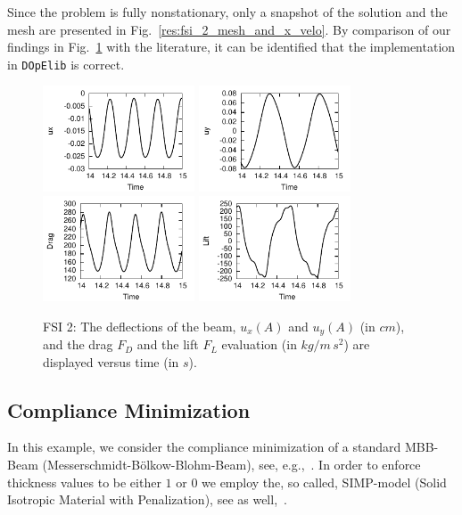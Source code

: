 \documentclass[smallextended]{svjour3}       %
\numberwithin{equation}{section}
\newcommand{\dope}{\texttt{DOpElib}}
\begin{document}
Since the problem is fully nonstationary, only a snapshot of the solution
and the mesh are presented in Fig.~\ref{res:fsi_2_mesh_and_x_velo}. 
By comparison of our findings in Fig.~\ref{res:results_ux_and_uy_fsi_2}
with the literature, it can be identified that 
the implementation in \dope{} is correct.

\begin{figure}[hbt]
\centering
{\includegraphics[width=4.5cm]{Pictures/ux_FSI_2_FS_t_3e-2_t_15e-3_global_2_Hron_grid.pdf}}
{\includegraphics[width=4.5cm]{Pictures/uy_FSI_2_FS_t_3e-2_t_15e-3_global_2_Hron_grid.pdf}}
{\includegraphics[width=4.5cm]{Pictures/Drag_fluid_FSI_2_FS_t_3e-2_t_15e-3_global_2_Hron_grid.pdf}}
{\includegraphics[width=4.5cm]{Pictures/Lift_fluid_FSI_2_FS_t_3e-2_t_15e-3_global_2_Hron_grid.pdf}}
\caption{FSI 2: The deflections of the beam, $u_x(A)$ and $u_y(A)$ (in $cm$), and 
the drag $F_D$ and the lift $F_L$ evaluation (in $kg/m\,s^2$) are displayed versus
time (in $s$).
} 
\label{res:results_ux_and_uy_fsi_2}
\end{figure}

\subsection{Compliance Minimization}
In this example, we consider the compliance minimization of a standard MBB-Beam 
(Messerschmidt-B\"olkow-Blohm-Beam), see, e.g.,~\cite{BendsoeSigmund:2003}. 
In order to enforce thickness values to be either $1$ or $0$ we employ 
the, so called, SIMP-model (Solid Isotropic Material with Penalization), 
see as well,~\cite{BendsoeSigmund:2003}. 
\end{document}
